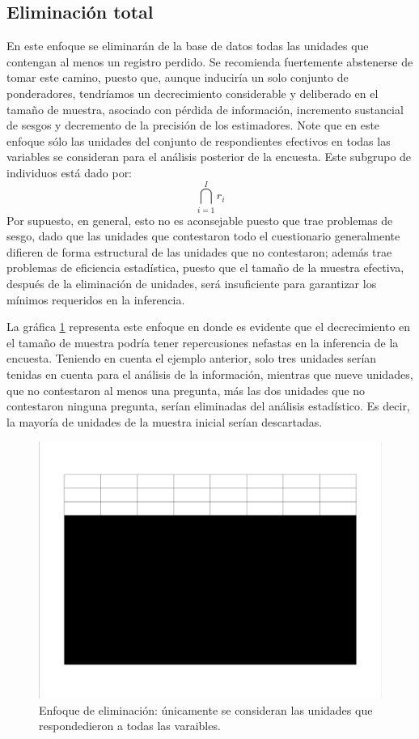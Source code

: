 \documentclass[
  12pt,
]{book}
\begin{document}
\hypertarget{eliminaciuxf3n-total}{%
\subsection{Eliminación total}\label{eliminaciuxf3n-total}}

En este enfoque se eliminarán de la base de datos todas las unidades que contengan al menos un registro perdido. Se recomienda fuertemente abstenerse de tomar este camino, puesto que, aunque induciría un solo conjunto de ponderadores, tendríamos un decrecimiento considerable y deliberado en el tamaño de muestra, asociado con pérdida de información, incremento sustancial de sesgos y decremento de la precisión de los estimadores. Note que en este enfoque sólo las unidades del conjunto de respondientes efectivos en todas las variables se consideran para el análisis posterior de la encuesta. Este subgrupo de individuos está dado por:
\[
\bigcap_{i=1}^I r_i
\]
Por supuesto, en general, esto no es aconsejable puesto que trae problemas de sesgo, dado que las unidades que contestaron todo el cuestionario generalmente difieren de forma estructural de las unidades que no contestaron; además trae problemas de eficiencia estadística, puesto que el tamaño de la muestra efectiva, después de la eliminación de unidades, será insuficiente para garantizar los mínimos requeridos en la inferencia.

La gráfica \ref{fig:figelimtotal} representa este enfoque en donde es evidente que el decrecimiento en el tamaño de muestra podría tener repercusiones nefastas en la inferencia de la encuesta. Teniendo en cuenta el ejemplo anterior, solo tres unidades serían tenidas en cuenta para el análisis de la información, mientras que nueve unidades, que no contestaron al menos una pregunta, más las dos unidades que no contestaron ninguna pregunta, serían eliminadas del análisis estadístico. Es decir, la mayoría de unidades de la muestra inicial serían descartadas.

\begin{figure}
\includegraphics[width=0.5\linewidth]{Pics/j2} \caption{Enfoque de eliminación: únicamente se consideran las unidades que respondedieron a todas las varaibles.}\label{fig:figelimtotal}
\end{figure}
\end{document}
